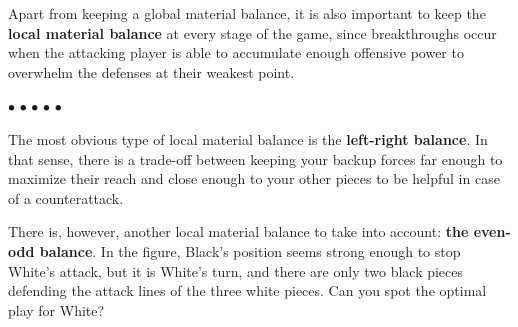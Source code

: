 \documentclass[a4paper,12pt]{article}
\begin{document}
    Apart from keeping a global material balance, it is also important to keep the \textbf{local material balance} at every stage of the game, since breakthroughs occur when the attacking player is able to accumulate enough offensive power to overwhelm the defenses at their weakest point.

    \begin{minipage}[c]{0.36\linewidth}
        \begin{center}
            \begin{othelloboardnorefs}{0.75}
                \annotationsfirstrow	{} {} {} {} {} {} {} {}
                \annotationssecondrow	{} {} {} {} {} {} {} {}
                \annotationsthirdrow	{} {} {} {} {} {} {} {}
                \annotationsfourthrow	{} {} {} {} {} {} {} {}
                \annotationsfifthrow	{} {} {} {$\bullet$} {} {$\bullet$} {} {}
                \annotationssixthrow	{} {} {} {} {$\bullet$} {} {} {}
                \annotationsseventhrow	{} {} {} {} {} {} {} {}
                \annotationseighthrow	{} {} {$\bullet$} {} {} {} {$\bullet$} {}
            \end{othelloboardnorefs}
        \end{center}
    \end{minipage}
    \hfill
    \begin{minipage}[c]{0.62\linewidth}
        The most obvious type of local material balance is the \textbf{left-right balance}. In that sense, there is a trade-off between keeping your backup forces far enough to maximize their reach and close enough to your other pieces to be helpful in case of a counterattack.

        There is, however, another local material balance to take into account: \textbf{the even-odd balance}.  In the figure, Black's position seems strong enough to stop White's attack, but it is White's turn, and there are only two black pieces defending the attack lines of the three white pieces. Can you spot the optimal play for White?
    \end{minipage}
\end{document}
